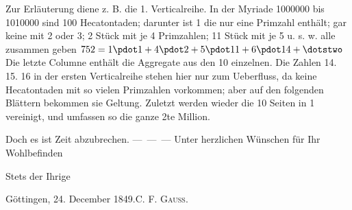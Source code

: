 Zur Erläuterung diene z. B. die 1. Verticalreihe. In der Myriade 1000000 bis 1010000 sind 100 Hecatontaden; darunter ist 1 die nur eine Primzahl enthält; gar keine mit 2 oder 3; 2 Stück mit je 4 Primzahlen; 11 Stück mit je 5 u. s. w. alle zusammen geben $752=1\pdot1+4\pdot2+5\pdot11+6\pdot14+\dotstwo$ Die letzte Columne enthält die Aggregate aus den 10 einzelnen. Die Zahlen 14. 15. 16 in der ersten Verticalreihe stehen hier nur zum Ueberfluss, da keine Hecatontaden mit so vielen Primzahlen vorkommen; aber auf den folgenden Blättern bekommen sie Geltung. Zuletzt werden wieder die 10 Seiten in 1 vereinigt, und umfassen so die ganze 2te Million.

Doch es ist Zeit abzubrechen. \mbox{— — —} Unter herzlichen Wünschen für Ihr Wohlbefinden
\begin{center}Stets der Ihrige\end{center}
\noindent Göttingen, 24. December 1849.\hfill C. F. \textsc{Gauss}.
\par\endgroup
